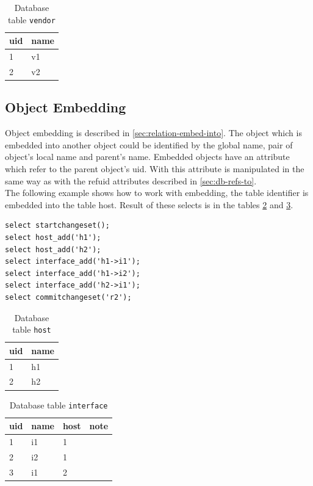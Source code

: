 \documentclass[deska]{subfiles}
\begin{document}
\begin{longtable}{ l | l }
    \caption{Database table {\tt vendor}}
    \label{tab:refs-vendor} \\
    uid & name \\
    \hline
    \endhead
    1 & v1\\
    2 & v2\\
    \hline
\end{longtable}


\subsection{Object Embedding}
Object embedding is described in \ref{sec:relation-embed-into}. The object which is embedded into another object could be identified by the global name, pair of object's local name and parent's name. Embedded objects have an attribute which refer to the parent object's uid. With this attribute is manipulated in the same way as with the refuid attributes described in \ref{sec:db-refs-to}.\\
The following example shows how to work with embedding, the table identifier is embedded into the table host. Result of these selects is in the tables \ref{tab:embed-host} and \ref{tab:embed-interface}.

\begin{verbatim}
select startchangeset();
select host_add('h1');
select host_add('h2');
select interface_add('h1->i1');
select interface_add('h1->i2');
select interface_add('h2->i1');
select commitchangeset('r2');
\end{verbatim}


\begin{longtable}{ l | l }
    \caption{Database table {\tt host}}
    \label{tab:embed-host} \\
    uid & name \\
    \hline
    \endhead
    1 & h1\\
    2 & h2\\
    \hline
\end{longtable}

\begin{longtable}{ l | l | l | l }
    \caption{Database table {\tt interface}}
    \label{tab:embed-interface} \\
    uid & name & host & note\\
    \hline
    \endhead
    1 & i1 & 1 & \\
    2 & i2 & 1 & \\
    3 & i1 & 2 & \\
    \hline
\end{longtable}
\end{document}

